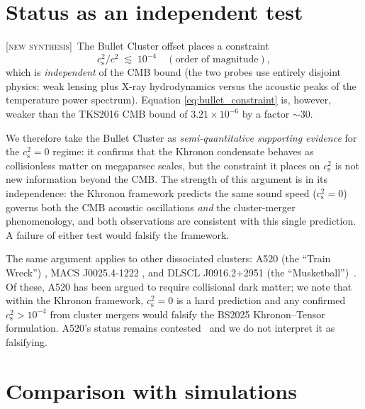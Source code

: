 \documentclass[prd,twocolumn,superscriptaddress,longbibliography,floatfix]{revtex4-2}
\newcommand{\cs}{c_{\mathrm{s}}}
\newcommand{\new}{\textsc{[new synthesis]}}
\begin{document}
\section{Status as an independent test}
\label{sec:test}

\new\ The Bullet Cluster offset places a constraint
\begin{equation}
\cs^{2}/c^{2} \;\lesssim\; 10^{-4}
\quad (\text{order of magnitude}),
\label{eq:bullet_constraint}
\end{equation}
which is \emph{independent} of the CMB bound (the two
probes use entirely disjoint physics: weak lensing
plus X-ray hydrodynamics versus the acoustic peaks of
the temperature power spectrum).  Equation
\eqref{eq:bullet_constraint} is, however, weaker than
the TKS2016 CMB bound of
$3.21 \times 10^{-6}$ by a factor $\sim 30$.

We therefore take the Bullet Cluster as
\emph{semi-quantitative supporting evidence} for the
$\cs^{2} = 0$ regime: it confirms that the Khronon
condensate behaves as collisionless matter on
megaparsec scales, but the constraint it places on
$\cs^{2}$ is not new information beyond the CMB.  The
strength of this argument is in its independence: the
Khronon framework predicts the same sound speed
($\cs^{2} = 0$) governs both the CMB acoustic
oscillations \emph{and} the cluster-merger
phenomenology, and both observations are consistent
with this single prediction.  A failure of either
test would falsify the framework.

The same argument applies to other dissociated
clusters: A520 (the ``Train Wreck'')
\cite{Mahdavi2007}, MACS J0025.4-1222
\cite{Bradac2008}, and DLSCL J0916.2+2951 (the
``Musketball'')~\cite{Dawson2012}.  Of these, A520 has
been argued to require collisional dark matter; we
note that within the Khronon framework, $\cs^{2} = 0$
is a hard prediction and any confirmed
$\cs^{2} > 10^{-4}$ from cluster mergers would
falsify the BS2025 Khronon--Tensor formulation.
A520's status remains contested~\cite{Jee2014} and
we do not interpret it as falsifying.

\section{Comparison with simulations}
\label{sec:sims}
\end{document}
